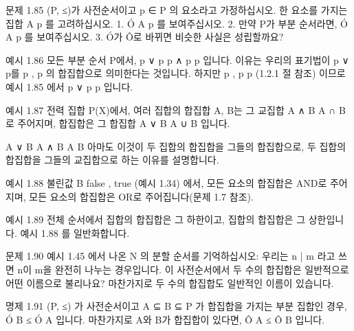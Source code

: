 \documentclass[11pt, a4paper, twoside, openany]{book}
\begin{document}
\par\medskip
문제 1.85
(P, ≤)가 사전순서이고 p ∈ P 의 요소라고 가정하십시오. 한 요소를 가지는 집합 A  { p } 를 고려하십시오.
1. Ó A  p 를 보여주십시오.
2. 만약 P\hspace{0pt}가 부분 순서라면, Ó A  p 를 보여주십시오.
3. Ó가 Ô로 바뀌면 비슷한 사실은 성립할까요?

\par\medskip
예시 1.86
모든 부분 순서 P\hspace{0pt}에서, p ∨ p  p ∧ p  p 입니다. 이유는 우리의 표기법이 p ∨ p\hspace{0pt}를 { p , p } 의 합집합으로 의미한다는 것입니다. 하지만 { p , p }  { p } (1.2.1 절 참조) 이므로 예시 1.85 에서 p ∨ p  p 입니다.

\par\medskip
예시 1.87
전력 집합 P(X)에서, 여러 집합의 합집합 A, B\hspace{0pt}는 그 교집합 A ∧ B  A ∩ B 로 주어지며, 합집합은 그 합집합 A ∨ B  A ∪ B 입니다.

\par\medskip
A ∨ B
A ∧ B
A
B
아마도 이것이 두 집합의 합집합을 그들의 합집합으로, 두 집합의 합집합을 그들의 교집합으로 하는 이유를 설명합니다.

\par\medskip
예시 1.88
불린값 B  { false , true } (예시 1.34) 에서, 모든 요소의 합집합은 AND\hspace{0pt}로 주어지며, 모든 요소의 합집합은 OR\hspace{0pt}로 주어집니다(문제 1.7 참조).

\par\medskip
예시 1.89
전체 순서에서 집합의 합집합은 그 하한이고, 집합의 합집합은 그 상한입니다. 예시 1.88 를 일반화합니다.

\par\medskip
문제 1.90
예시 1.45 에서 나온 N 의 분할 순서를 기억하십시오: 우리는 n | m 라고 쓰면 n\hspace{0pt}이 m\hspace{0pt}을 완전히 나누는 경우입니다. 이 사전순서에서 두 수의 합집합은 일반적으로 어떤 이름으로 불리나요? 마찬가지로 두 수의 합집합도 일반적인 이름이 있습니다.

\par\medskip
명제 1.91
(P, ≤) 가 사전순서이고 A ⊆ B ⊆ P 가 합집합을 가지는 부분 집합인 경우, Ó B ≤ Ó A 입니다. 마찬가지로 A\hspace{0pt}와 B\hspace{0pt}가 합집합이 있다면, Ô A ≤ Ô B 입니다.
\end{document}
